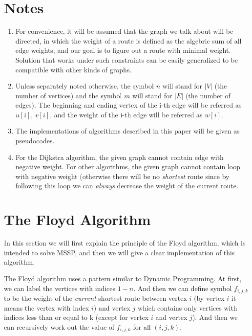 \documentclass[a4paper,11pt,twocolumn]{article}
\begin{document}
\section{Notes}

\begin{enumerate}

\item{For convenience, it will be assumed that the graph we talk about will be directed, in which the weight of a route is defined as the algebric sum of all edge weights, and our goal is to figure out a route with minimal weight. Solution that works under such constraints can be easily generalized to be compatible with other kinds of graphs. }

\item{Unless separately noted otherwise, the symbol $n$ will stand for $|V|$ (the number of vertices) and the symbol $m$ will stand for $|E|$ (the number of edges). The beginning and ending vertex of the i-th edge will be referred as $u[i]$, $v[i]$, and the weight of the i-th edge will be referred as $w[i]$. }

\item{The implementations of algorithms described in this paper will be given as pseudocodes. }

\item{For the Dijkstra algorithm, the given graph cannot contain edge with negative weight. For other algorithms, the given graph cannot contain loop with negative weight (otherwise there will be no \emph{shortest} route since by following this loop we can \emph{always} decrease the weight of the current route. }

\end{enumerate}

\section{The Floyd Algorithm}

In this section we will first explain the principle of the Floyd algorithm, which is intended to solve MSSP, and then we will give a clear implementation of this algorithm. 

The Floyd algorithm uses a pattern similar to Dynamic Programming. At first, we can label the vertices with indices $1-n$. And then we can define symbol $f_{i,j,k}$ to be the weight of the \emph{current} shortest route between vertex $i$ (by vertex $i$ it means the vertex with index $i$) and vertex $j$ which contains only vertices with indices less than or equal to k (except for vertex $i$ and vertex $j$). And then we can recursively work out the value of $f_{i,j,k}$ for all $(i,j,k)$. 
\end{document}
